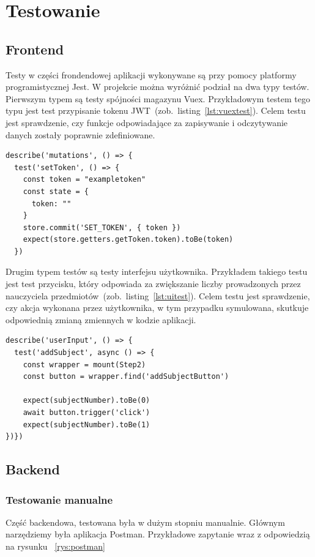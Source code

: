 
\chapter{Testowanie}
\section{Frontend}
Testy w części frondendowej aplikacji wykonywane są przy pomocy platformy programistycznej Jest. W projekcie można wyróżnić podział na dwa typy testów. Pierwszym typem są testy spójności magazynu Vuex. Przykładowym testem tego typu jest test przypisanie tokenu JWT~(zob.~listing~\ref{lst:vuextest}). Celem testu jest sprawdzenie, czy funkcje odpowiadające za zapisywanie i odczytywanie danych zostały poprawnie zdefiniowane.
\begin{lstlisting}[caption=Test spójności magazynu Vuex,label={lst:vuextest}] 
describe('mutations', () => {
  test('setToken', () => {
    const token = "exampletoken"
    const state = {
      token: ""
    }
    store.commit('SET_TOKEN', { token })
    expect(store.getters.getToken.token).toBe(token)
  })
\end{lstlisting}

Drugim typem testów są testy interfejsu użytkownika. Przykładem takiego testu jest test przycisku, który odpowiada za zwiększanie liczby prowadzonych przez nauczyciela przedmiotów~(zob.~listing~\ref{lst:uitest}). Celem testu jest sprawdzenie, czy akcja wykonana przez użytkownika, w tym przypadku symulowana, skutkuje odpowiednią zmianą zmiennych w kodzie aplikacji. 
\begin{lstlisting}[caption=Test interfejsu użytkownika,label={lst:uitest}] 
describe('userInput', () => {
  test('addSubject', async () => {
    const wrapper = mount(Step2)
    const button = wrapper.find('addSubjectButton')

    expect(subjectNumber).toBe(0)
    await button.trigger('click')
    expect(subjectNumber).toBe(1)
})})
\end{lstlisting}
\section{Backend}
\subsection{Testowanie manualne}

Część backendowa, testowana była w dużym stopniu manualnie. Głównym narzędziemy była aplikacja Postman. Przykładowe zapytanie wraz z odpowiedzią na rysunku ~\ref{rys:postman}

